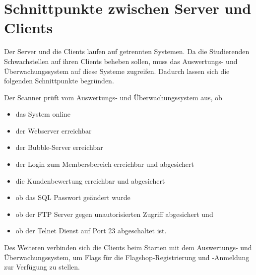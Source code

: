 \section{Schnittpunkte zwischen Server und Clients}
\label{sec:Schnittpunkte_zwischen_Server_und_Clients}

Der Server und die Clients laufen auf getrennten Systemen. Da die Studierenden Schwachstellen auf ihren Clients beheben sollen, muss das Auswertungs- und Überwachungssystem auf diese Systeme zugreifen. Dadurch lassen sich die folgenden Schnittpunkte begründen.

Der Scanner prüft vom Auswertungs- und Überwachungssystem aus, ob 
\begin{itemize}
	\item das System online
	\item der Webserver erreichbar
	\item der Bubble-Server erreichbar
	\item der Login zum Membersbereich erreichbar und abgesichert
	\item die Kundenbewertung erreichbar und abgesichert
	\item ob das SQL Passwort geändert wurde
	\item ob der FTP Server gegen unautorisierten Zugriff abgesichert und
	\item ob der Telnet Dienst auf Port 23 abgeschaltet ist. 
\end{itemize}

Des Weiteren verbinden sich die Clients beim Starten mit dem Auswertungs- und Überwachungssystem, um Flags für die Flagshop-Registrierung und -Anmeldung zur Verfügung zu stellen.
